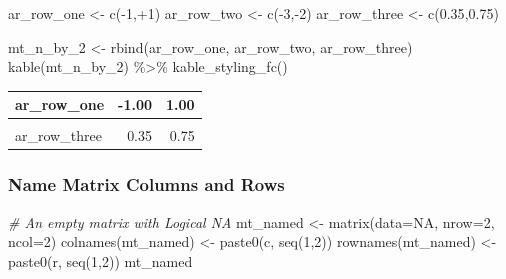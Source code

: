 \documentclass[
]{book}
\newenvironment{Shaded}{\begin{snugshade}}{\end{snugshade}}
\newcommand{\AttributeTok}[1]{\textcolor[rgb]{0.77,0.63,0.00}{#1}}
\newcommand{\CommentTok}[1]{\textcolor[rgb]{0.56,0.35,0.01}{\textit{#1}}}
\newcommand{\ConstantTok}[1]{\textcolor[rgb]{0.00,0.00,0.00}{#1}}
\newcommand{\DecValTok}[1]{\textcolor[rgb]{0.00,0.00,0.81}{#1}}
\newcommand{\FloatTok}[1]{\textcolor[rgb]{0.00,0.00,0.81}{#1}}
\newcommand{\FunctionTok}[1]{\textcolor[rgb]{0.00,0.00,0.00}{#1}}
\newcommand{\NormalTok}[1]{#1}
\newcommand{\OtherTok}[1]{\textcolor[rgb]{0.56,0.35,0.01}{#1}}
\newcommand{\SpecialCharTok}[1]{\textcolor[rgb]{0.00,0.00,0.00}{#1}}
\newcommand{\StringTok}[1]{\textcolor[rgb]{0.31,0.60,0.02}{#1}}
\begin{document}
\begin{Shaded}
\begin{Highlighting}[]
\NormalTok{ar\_row\_one }\OtherTok{\textless{}{-}} \FunctionTok{c}\NormalTok{(}\SpecialCharTok{{-}}\DecValTok{1}\NormalTok{,}\SpecialCharTok{+}\DecValTok{1}\NormalTok{)}
\NormalTok{ar\_row\_two }\OtherTok{\textless{}{-}} \FunctionTok{c}\NormalTok{(}\SpecialCharTok{{-}}\DecValTok{3}\NormalTok{,}\SpecialCharTok{{-}}\DecValTok{2}\NormalTok{)}
\NormalTok{ar\_row\_three }\OtherTok{\textless{}{-}} \FunctionTok{c}\NormalTok{(}\FloatTok{0.35}\NormalTok{,}\FloatTok{0.75}\NormalTok{)}

\NormalTok{mt\_n\_by\_2 }\OtherTok{\textless{}{-}} \FunctionTok{rbind}\NormalTok{(ar\_row\_one, ar\_row\_two, ar\_row\_three)}
\FunctionTok{kable}\NormalTok{(mt\_n\_by\_2) }\SpecialCharTok{\%\textgreater{}\%}
  \FunctionTok{kable\_styling\_fc}\NormalTok{()}
\end{Highlighting}
\end{Shaded}

\begin{table}[!h]
\centering
\begin{tabular}{l|r|r}
\hline
ar\_row\_one & -1.00 & 1.00\\
\hline
\cellcolor{gray!6}{ar\_row\_two} & \cellcolor{gray!6}{-3.00} & \cellcolor{gray!6}{-2.00}\\
\hline
ar\_row\_three & 0.35 & 0.75\\
\hline
\end{tabular}
\end{table}

\hypertarget{name-matrix-columns-and-rows}{%
\subsubsection{Name Matrix Columns and Rows}\label{name-matrix-columns-and-rows}}

\begin{Shaded}
\begin{Highlighting}[]
\CommentTok{\# An empty matrix with Logical NA}
\NormalTok{mt\_named }\OtherTok{\textless{}{-}} \FunctionTok{matrix}\NormalTok{(}\AttributeTok{data=}\ConstantTok{NA}\NormalTok{, }\AttributeTok{nrow=}\DecValTok{2}\NormalTok{, }\AttributeTok{ncol=}\DecValTok{2}\NormalTok{)}
\FunctionTok{colnames}\NormalTok{(mt\_named) }\OtherTok{\textless{}{-}} \FunctionTok{paste0}\NormalTok{(}\StringTok{\textquotesingle{}c\textquotesingle{}}\NormalTok{, }\FunctionTok{seq}\NormalTok{(}\DecValTok{1}\NormalTok{,}\DecValTok{2}\NormalTok{))}
\FunctionTok{rownames}\NormalTok{(mt\_named) }\OtherTok{\textless{}{-}} \FunctionTok{paste0}\NormalTok{(}\StringTok{\textquotesingle{}r\textquotesingle{}}\NormalTok{, }\FunctionTok{seq}\NormalTok{(}\DecValTok{1}\NormalTok{,}\DecValTok{2}\NormalTok{))}
\NormalTok{mt\_named}
\end{Highlighting}
\end{Shaded}
\end{document}
